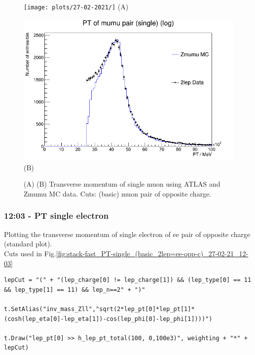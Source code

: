 \begin{figure}[h!]
    \centering
    \begin{minipage}{0.5\textwidth}
        \centering
        \texttt{[image: plots/27-02-2021/]}
        (A)
    \end{minipage}\hfill
    \begin{minipage}{0.5\textwidth}
        \centering
        \includegraphics[width=\linewidth]{plots/27-02-2021/2-stack-Zmumu-fast_PT-single_(basic_2lep=mumu-opp-c)_27-02-21_12-00.png}
        (B)
    \end{minipage}
    \caption{(A)  (B) Transverse momentum of single muon using ATLAS and Zmumu MC data.  Cuts: (basic) muon pair of opposite charge.}
    \label{fig:2-stack-Zmumu-fast_PT-single_(basic_2lep=mumu-opp-c)_27-02-21_12-00}
\end{figure}

\subsubsection*{12:03 - PT single electron}
Plotting the transverse momentum of single electron of ee pair of opposite charge (standard plot).
\\
Cuts used in Fig.\ref{fig:stack-fast_PT-single_(basic_2lep=ee-opp-c)_27-02-21_12-03}
\begin{lstlisting}
lepCut = "(" + "(lep_charge[0] != lep_charge[1]) && (lep_type[0] == 11 && lep_type[1] == 11) && lep_n==2" + ")"

t.SetAlias("inv_mass_Zll","sqrt(2*lep_pt[0]*lep_pt[1]*(cosh(lep_eta[0]-lep_eta[1])-cos(lep_phi[0]-lep_phi[1])))")

t.Draw("lep_pt[0] >> h_lep_pt_total(100, 0,100e3)", weighting + "*" + lepCut)
\end{lstlisting}

